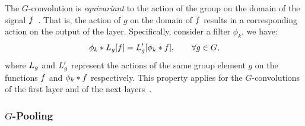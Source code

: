 The $G$-convolution is \textit{equivariant} to the action of the group on the domain of the signal $f$~\cite{cohen2016group}. That is, the action of $g$ on the domain of $f$ results in a corresponding action on the output of the layer. Specifically, consider a filter $\phi_k$, we have:
\begin{equation}
    \phi_k * L_{g}[f] = L'_{g}[\phi_k * f], \qquad  \forall g \in G,
\end{equation}
where $L_g$ and $L'_g$ represent the actions of the same group element $g$ on the functions $f$ and $\phi_k * f$ respectively. This property applies for the $G$-convolutions of the first layer and of the next layers~\cite{cohen2016group}. %





\subsubsection{$G$-Pooling}
\label{sec:g-pooling}


